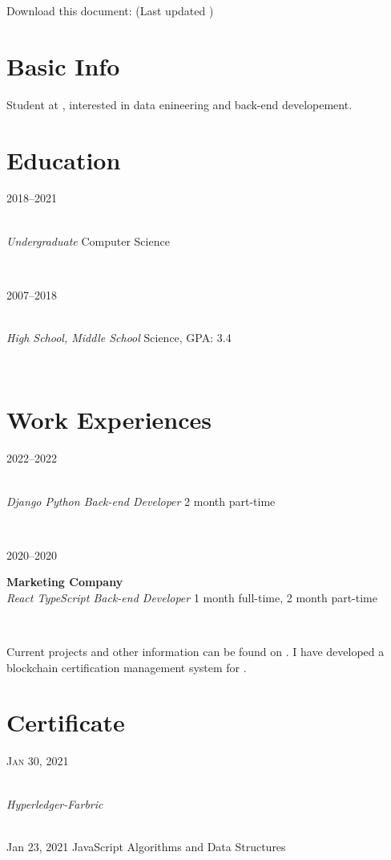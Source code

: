 \documentclass[letterpaper, 10pt]{article}
\author{Vikrom Narula}
\date{\today}
\let\oldhref\href
\renewcommand{\href}[3][blue]{\oldhref{#2}{\color{#1}{#3}}}
\renewcommand{\maketitle}{
    \hspace{.25\textwidth}
    \begin{minipage}[t]{.5\textwidth}
        \par{\centering{\Huge  \bfseries{\theauthor}}\par}
    \end{minipage}
    \begin{minipage}[t]{.25\textwidth}{
        \footnotesize\hfill{}\color{gray}
        \hfill{}Download this document:
        \hfill{}\href[gray]{https://github.com/narula2000/Resume/blob/master/cv.pdf}{Here}
        \hfill{}(Last updated \thedate)
    }
    \end{minipage}
}
\newcommand{\entry}[4]{
    \begin{minipage}[t]{.15 \linewidth}
        \hfill \textsc{#1}
    \end{minipage}
    \hfill \vline \hfill
    \begin{minipage}[t]{.80 \linewidth}
        {\bf#2} \\ \textit{#3} \footnotesize{#4}
    \end{minipage} \\
    \vspace{.2cm}
}%
\begin{document}
\maketitle

\section{Basic Info}

Student at \href{https://muic.mahidol.ac.th/eng}{Mahidol University International College},
interested in data enineering and back-end developement. \\

\section{Education}

\entry{2018--2021}
	{\href{https://muic.mahidol.ac.th/eng}{Mahidol University International College}}
	{Undergraduate}
	{Computer Science}

\entry{2007--2018}
	{\href{https://www.repsbanchang.com}{Rayong English Programme School}}
	{High School, Middle School}
	{Science, GPA: 3.4}

\section{Work Experiences}

\entry{2022--2022}
    {\href{https://thegang.tech/?lang=en}{The Gang Technology}}
	{Django Python Back-end Developer}
	{2 month part-time}

\entry{2020--2020}
    {Marketing Company}
	{React TypeScript Back-end Developer}
	{1 month full-time, 2 month part-time}


Current projects and other information can be found on
\href{https://github.com/narula2000}{Github}.
I have developed a blockchain certification management system for
\href{https://github.com/sirinnear/AtHome-Project}{AtHome}.

\section{Certificate}

\entry{Jan 30, 2021}
    {\href{https://courses.cognitiveclass.ai/certificates/2552ddac4a7b442ba08a882913fde68e}{IBM-Blockchain}}
    {Hyperledger-Farbric}


\entry{Jan 23, 2021}
    {\href{https://freecodecamp.org/certification/fccfd875aea-9c57-4c5d-a3c3-541bdb54fdb7/javascript-algorithms-and-data-structures}{FreeCodeCamp-Javascript}}
    {JavaScript Algorithms and Data Structures}
\end{document}
